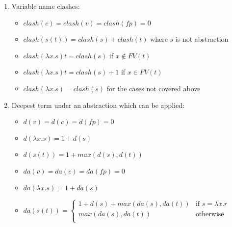 \documentclass[a4paper]{article}
\begin{document}
\begin{enumerate}
\item Variable name clashes:
  \begin{itemize}
  \item $clash(c)=clash(v)=clash(fp)=0$
  \item $clash(s(t)) = clash(s) + clash(t)$ where $s$ is not abstraction
  \item $clash(\lambda x . s) t = clash(s)$ if $x \not \in FV(t)$
  \item $clash(\lambda x . s) t = clash(s) + 1$ if $x \in FV(t)$
  \item $clash(\lambda x . s) = clash(s)$ for the cases not covered above
  \end{itemize}

\item Deepest term under an abstraction which can be applied:
  \begin{itemize}
  \item $d(v)=d(c)=d(fp)=0$
  \item $d(\lambda x . s)=1 + d(s)$
  \item $d(s(t))= 1 + max(d(s), d(t))$
  \end{itemize}

  \begin{itemize}
  \item $da(v)=da(c)=da(fp)=0$
  \item $da(\lambda x . s)=1 + da(s)$
  \item $da(s(t))= \left\{
      \begin{array}{rl}
        1 + d(s) + max(da(s),da(t))&\mbox{if }s=\lambda x.r\\
        max(da(s),da(t))&\mbox{otherwise}\\
      \end{array}\right.$
  \end{itemize}

\end{enumerate}
\end{document}
